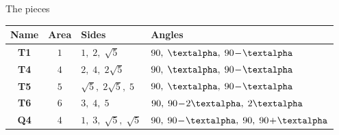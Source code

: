 \documentclass[14pt]{beamer}
\begin{document}
\begin{frame}{The pieces}
\begin{center}
            {\footnotesize
            \begin{tabular}{c|c|l|l}
                \;\;\textbf{Name}\;\; & \;\;\textbf{Area}\;\; & \;\;\textbf{Sides}          & \;\;\textbf{Angles} \\ \hline
                \textbf{T1}   & $1$           & \;\;$1,\; 2,\; \sqrt{5}$          & \;\;$90,\; \text{\textalpha},\; 90\!-\!\text{\textalpha}$   \\ \hline
                \textbf{T4}   & $4$           & \;\;$2,\; 4,\; 2\sqrt{5}$         & \;\;$90,\; \text{\textalpha},\; 90\!-\!\text{\textalpha}$   \\ \hline
                \textbf{T5}   & $5$           & \;\;$\sqrt{5},\; 2\sqrt{5},\; 5$  & \;\;$90,\; \text{\textalpha},\; 90\!-\!\text{\textalpha}$   \\ \hline
                \textbf{T6}   & $6$           & \;\;$3,\; 4,\; 5$                 & \;\;$90,\; 90\!-\!2\text{\textalpha},\; 2\text{\textalpha}$ \\ \hline
                \textbf{Q4}   & $4$           & \;\;$1,\; 3,\; \sqrt{5},\; \sqrt{5}$\;\; & \;\;$90,\; 90\!-\!\text{\textalpha},\; 90,\; 90\!+\!\text{\textalpha}$\;\;
            \end{tabular}}
        \end{center}
    \end{frame}

\end{document}
